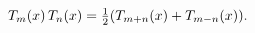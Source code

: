 \[\mathop{T_{m}\/}\nolimits\!\left(x\right)\mathop{T_{n}\/}\nolimits\!\left(x%
\right)=\tfrac{1}{2}(\mathop{T_{m+n}\/}\nolimits\!\left(x\right)+\mathop{T_{m-%
n}\/}\nolimits\!\left(x\right)).\]